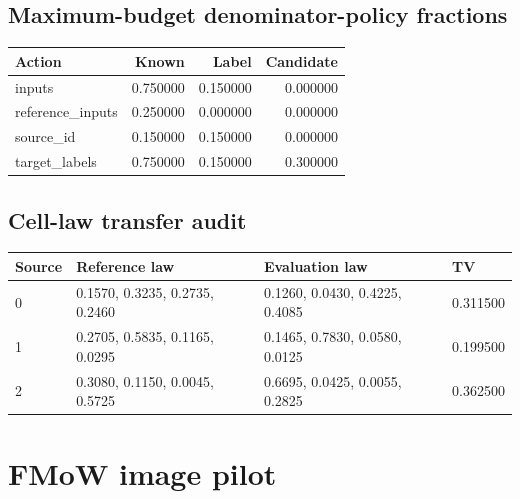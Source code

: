 \reservetable
\subsection{Maximum-budget denominator-policy fractions}

\begingroup\small
\setlength{\tabcolsep}{4pt}
\begin{longtable}{lrrr}
\toprule

Action & Known & Label & Candidate\\\midrule\endhead

inputs & 0.750000 & 0.150000 & 0.000000\\

reference\_inputs & 0.250000 & 0.000000 & 0.000000\\

source\_id & 0.150000 & 0.150000 & 0.000000\\

target\_labels & 0.750000 & 0.150000 & 0.300000\\

\bottomrule
\end{longtable}
\endgroup

\reservetable
\subsection{Cell-law transfer audit}

\begingroup\small
\setlength{\tabcolsep}{4pt}
\begin{longtable}{p{}p{}p{}p{}}
\toprule

Source & Reference law & Evaluation law & TV\\\midrule\endhead

0 & 0.1570, 0.3235, 0.2735, 0.2460 & 0.1260, 0.0430, 0.4225, 0.4085 & 0.311500\\

1 & 0.2705, 0.5835, 0.1165, 0.0295 & 0.1465, 0.7830, 0.0580, 0.0125 & 0.199500\\

2 & 0.3080, 0.1150, 0.0045, 0.5725 & 0.6695, 0.0425, 0.0055, 0.2825 & 0.362500\\

\bottomrule
\end{longtable}
\endgroup

\reservetable
\section{FMoW image pilot}

